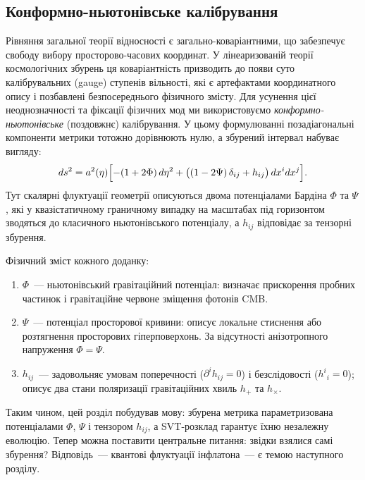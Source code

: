 \documentclass[12pt, a4paper]{article}
\begin{document}
\subsection{Конформно-ньютонівське калібрування}

Рівняння загальної теорії відносності є загально-коваріантними, що забезпечує
свободу вибору просторово-часових координат. У лінеаризованій теорії
космологічних збурень ця коваріантність призводить до появи суто
калібрувальних (gauge) ступенів вільності, які є артефактами координатного
опису і позбавлені безпосереднього фізичного змісту. Для усунення цієї
неоднозначності та фіксації фізичних мод ми використовуємо
\emph{конформно-ньютонівське} (поздовжнє) калібрування. У цьому формулюванні
позадіагональні компоненти метрики тотожно дорівнюють нулю, а збурений
інтервал набуває вигляду:
\begin{equation}\label{eq:perturbed_metric}
  ds^2 = a^2(\eta)\Bigl[
    -(1 + 2\Phi)\,d\eta^2
    + \bigl((1 - 2\Psi)\,\delta_{ij} + h_{ij}\bigr)\,dx^i dx^j
  \Bigr].
\end{equation}
Тут скалярні флуктуації геометрії описуються двома потенціалами
Бардіна $\Phi$ та $\Psi$ \cite{bardeen_1980}, які у квазістатичному
граничному випадку на масштабах під горизонтом зводяться до класичного
ньютонівського потенціалу, а $h_{ij}$ відповідає за тензорні збурення.

Фізичний зміст кожного доданку:
\begin{enumerate}
  \item $\Phi$~--- ньютонівський гравітаційний потенціал:
        визначає прискорення пробних частинок і гравітаційне
        червоне зміщення фотонів CMB.
  \item $\Psi$~--- потенціал просторової кривини: описує
        локальне стиснення або розтягнення просторових
        гіперповерхонь. За відсутності анізотропного напруження
        $\Phi = \Psi$.
  \item $h_{ij}$~--- задовольняє умовам поперечності
        ($\partial^i h_{ij} = 0$) і безслідовості
        ($h^i{}_i = 0$); описує два стани поляризації
        гравітаційних хвиль $h_+$ та $h_\times$.
\end{enumerate}

Таким чином, цей розділ побудував мову: збурена метрика
параметризована потенціалами $\Phi$, $\Psi$ і тензором $h_{ij}$,
а SVT-розклад гарантує їхню незалежну еволюцію. Тепер можна
поставити центральне питання: звідки взялися самі збурення?
Відповідь~--- квантові флуктуації інфлатона~--- є темою
наступного розділу.
\end{document}
